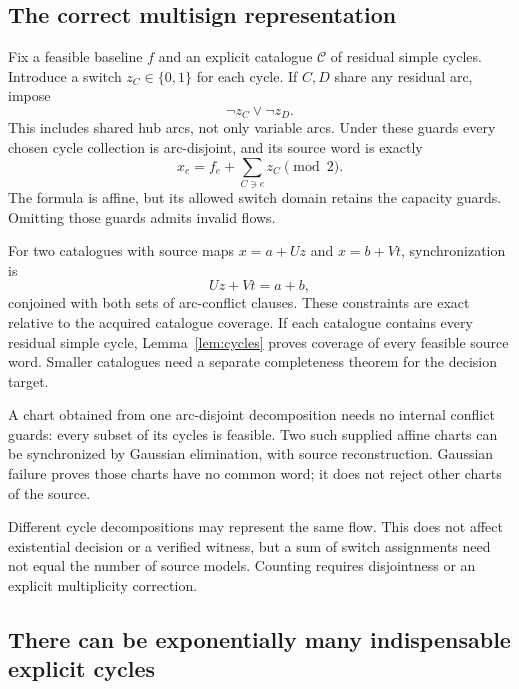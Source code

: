 \documentclass[11pt,letterpaper]{article}
\theoremstyle{definition}
\begin{document}
\subsection{The correct multisign representation}

Fix a feasible baseline $f$ and an explicit catalogue $\mathcal C$ of residual simple cycles. Introduce a switch $z_C\in\{0,1\}$ for each cycle. If $C,D$ share any residual arc, impose
\[
\neg z_C\lor\neg z_D.
\]
This includes shared hub arcs, not only variable arcs. Under these guards every chosen cycle collection is arc-disjoint, and its source word is exactly
\[
x_e=f_e+\sum_{C\ni e}z_C\pmod2.
\]
The formula is affine, but its allowed switch domain retains the capacity guards. Omitting those guards admits invalid flows.

For two catalogues with source maps $x=a+Uz$ and $x=b+Vt$, synchronization is
\[
Uz+Vt=a+b,
\]
conjoined with both sets of arc-conflict clauses. These constraints are exact relative to the acquired catalogue coverage. If each catalogue contains every residual simple cycle, Lemma~\ref{lem:cycles} proves coverage of every feasible source word. Smaller catalogues need a separate completeness theorem for the decision target.

A chart obtained from one arc-disjoint decomposition needs no internal conflict guards: every subset of its cycles is feasible. Two such supplied affine charts can be synchronized by Gaussian elimination, with source reconstruction. Gaussian failure proves those charts have no common word; it does not reject other charts of the source.

Different cycle decompositions may represent the same flow. This does not affect existential decision or a verified witness, but a sum of switch assignments need not equal the number of source models. Counting requires disjointness or an explicit multiplicity correction.

\subsection{There can be exponentially many indispensable explicit cycles}
\end{document}
